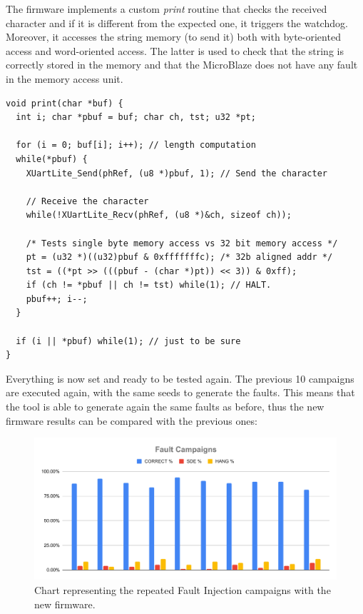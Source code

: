 The firmware implements a custom \textit{print} routine that checks the received character and if it is different from the expected one, it triggers the watchdog. Moreover, it accesses the string memory (to send it) both with byte-oriented access and word-oriented access. The latter is used to check that the string is correctly stored in the memory and that the MicroBlaze does not have any fault in the memory access unit.

\begin{lstlisting}[style=C]
void print(char *buf) {
  int i; char *pbuf = buf; char ch, tst; u32 *pt;

  for (i = 0; buf[i]; i++); // length computation
  while(*pbuf) {
    XUartLite_Send(phRef, (u8 *)pbuf, 1); // Send the character

    // Receive the character
    while(!XUartLite_Recv(phRef, (u8 *)&ch, sizeof ch)); 

    /* Tests single byte memory access vs 32 bit memory access */
    pt = (u32 *)((u32)pbuf & 0xfffffffc); /* 32b aligned addr */
    tst = ((*pt >> (((pbuf - (char *)pt)) << 3)) & 0xff); 
    if (ch != *pbuf || ch != tst) while(1); // HALT.
    pbuf++; i--;
  }

  if (i || *pbuf) while(1); // just to be sure
}
\end{lstlisting}

Everything is now set and ready to be tested again. The previous 10 campaigns are executed again, with the same seeds to generate the faults. This means that the tool is able to generate again the same faults as before, thus the new firmware results can be compared with the previous ones:

\begin{figure}[H]
\centering
\includegraphics[width=0.95\linewidth]{images/chapter5/cici_cici.pdf}
\caption{Chart representing the repeated Fault Injection campaigns with the new firmware.}
\end{figure}

